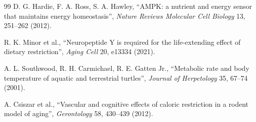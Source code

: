 \documentclass[11pt]{article}
\begin{document}
\begin{thebibliography}{99}
		D. G. Hardie, F. A. Ross, S. A. Hawley, ``AMPK: a nutrient and energy sensor that maintains energy homeostasis'', \emph{Nature Reviews Molecular Cell Biology} 13, 251–262 (2012).
		
		R. K. Minor et al., ``Neuropeptide Y is required for the life-extending effect of dietary restriction'', \emph{Aging Cell} 20, e13334 (2021).
		
		A. L. Southwood, R. H. Carmichael, R. E. Gatten Jr., ``Metabolic rate and body temperature of aquatic and terrestrial turtles'', \emph{Journal of Herpetology} 35, 67–74 (2001).
		
		A. Csiszar et al., ``Vascular and cognitive effects of caloric restriction in a rodent model of aging'', \emph{Gerontology} 58, 430–439 (2012).
		
	\end{thebibliography}
	
\end{document}
